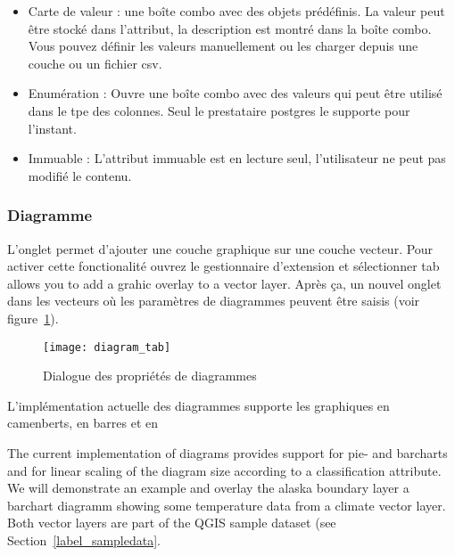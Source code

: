 \begin{itemize}
\begin{itemize}
\item Carte de valeur : une boîte combo avec des objets prédéfinis. La valeur peut être stocké dans l'attribut, la description est montré dans la boîte combo. Vous pouvez définir les valeurs manuellement ou les charger depuis une couche ou un fichier csv.
\item Enumération : Ouvre une boîte combo avec des valeurs qui peut être utilisé dans le tpe des colonnes. Seul le prestataire postgres le supporte pour l'instant.
\item Immuable : L'attribut immuable est en lecture seul, l'utilisateur ne peut pas modifié le contenu.
\end{itemize}

\subsubsection{Diagramme}\label{sec:diagram}
L'onglet  permet d'ajouter une couche graphique sur une couche vecteur. Pour activer cette fonctionalité ouvrez le gestionnaire d'extension et sélectionner tab allows you to add a grahic overlay to a vector layer. Après ça, un nouvel onglet dans les  vecteurs où les paramètres de diagrammes peuvent être saisis (voir figure~\ref{fig:diagramtab}).

\begin{figure}[ht]
   \begin{center}
   \caption{Dialogue des propriétés de diagrammes \nixcaption}\label{fig:diagramtab}\smallskip
   \texttt{[image: diagram\_tab]}
\end{center}
\end{figure}

L'implémentation actuelle des diagrammes supporte les graphiques en camenberts, en barres et en 

The current implementation of diagrams provides support for pie- and barcharts
and for linear scaling of the diagram size according to a classification
attribute. We will demonstrate an example and overlay the alaska boundary
layer a barchart diagramm showing some temperature data from a climate vector
layer. Both vector layers are part of the QGIS sample dataset (see
Section~\ref{label_sampledata}.


\end{itemize}
